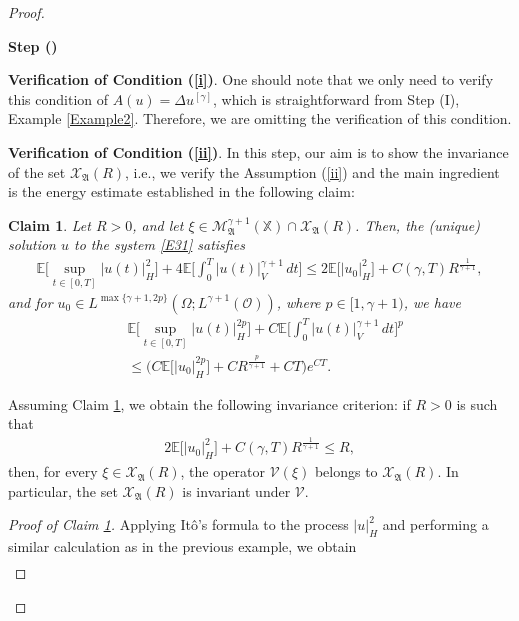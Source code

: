 \documentclass[english,a4paper,11pt]{amsart}
\theoremstyle{plain}
\newtheorem{claim}[theorem]{Claim}
\theoremstyle{definition}
\theoremstyle{remark}
\numberwithin{equation}{section}
\newcounter{lil1}
\newenvironment{step}
{\begin{list} { \bf Step (\Roman{lil1})}
		{ \usecounter{lil1}
			\setlength{\leftmargin}{0.0cm}
			\setlength{\topsep}{0.2cm}
			\setlength{\itemsep}{0.0cm}
			\setlength{\parsep}{0.1cm}
			\setlength{\itemindent}{0.8cm}
			\setlength{\parskip}{0.0cm}}}
	{\end{list}}
\newcounter{lil33}
\newcounter{lil1q}
\newcommand{\MA}{\mathfrak{A}}
\newcommand{\EE}{ \mathbb{E} }
\newcommand{\Mcal} {{\mathcal M}}
\newcommand{\Vcal} {{\mathcal V}}
\newcommand{\Xcal} {{\mathcal X}}
\newcommand{\Afrak} {{\mathfrak A}}
\newcommand{\X}{\mathbb{X}}
\begin{document}
\begin{proof}
\begin{step}
	\item \textbf{Verification of Condition (\ref{i})}. One should note that we only need to verify this condition of $A(u)=\Delta u^{[\gamma]}$, which is straightforward from Step (I), Example \ref{Example2}. Therefore, we are omitting the verification of this condition. 

	
\item \textbf{Verification of Condition (\ref{ii})}. In this step, our aim is to show the invariance of the set $\Xcal_\MA(R)$, i.e., we verify the Assumption (\ref{ii}) and the main ingredient is the energy estimate established in the following claim:
\begin{claim}\label{CLI3}
	Let $R>0$, and let $\xi\in \Mcal_{\Afrak}^{\gamma+1}(\X)\cap \mathcal{X}_\MA(R)$. Then, the (unique) solution $u$ to the system \eqref{E31} satisfies
	\begin{align}\label{EG}
			\EE\bigg[\sup_{t\in[0,T]} | u(t) | _H^2\bigg]+ 4\EE\bigg[\int_0^T | u(t) | _V^{\gamma+1}\,dt \bigg]
		 \leq 2 \EE\big[ | u_0 | _{H}^2\big]+C (\gamma,T)	R^{\frac{1}{\gamma+1}},
		 \end{align} and for $u_0\in L^{\max\{\gamma+1,2p\}}(\Omega;L^{\gamma+1}(\mathcal{O}))$, where $p\in [1,\gamma+1)$, we have
		 \begin{align*}
		 &	\EE\bigg[\sup_{t\in[0,T]}	 | u(t) | _{H}^{2p}\bigg] +C\EE\bigg[\int_0^T | u(t) | _V^{\gamma+1}\,dt\bigg]^p \\& \leq \Big(C\EE\big[	 | u_0 | _{H}^{2p}\big]+CR^\frac{p}{\gamma+1}+CT\Big)e^{CT}. 
		 \end{align*}
\end{claim}
%
Assuming Claim \ref{CLI3}, we obtain the following invariance criterion: if $R>0$ is such that
\begin{align*} 2 \EE\big[ | u_0 | _{H}^2\big]+C (\gamma,T)	R^{\frac{1}{\gamma+1}}\leq R,
\end{align*}
%
then, for every $\xi\in\Xcal_{\MA}(R)$, the operator $\Vcal(\xi)$ belongs to $\Xcal_\MA(R)$. In particular, the set $\Xcal_\MA(R)$ is invariant under $\Vcal$. 
%
\begin{proof}[Proof of Claim \ref{CLI3}]
Applying It\^o's formula to the process $ | u | _H^2$ and performing a similar calculation as in the previous example, we obtain 
\begin{align}\label{EG1}\nonumber

\end{align}
\end{proof}
\end{step}
\end{proof}
\end{document}
